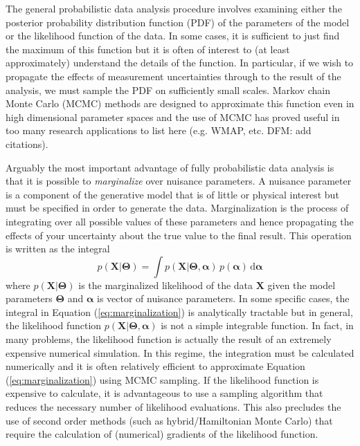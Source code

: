 \documentclass[12pt,preprint]{aastex}
\newcommand{\eq}[1]{Equation (\ref{eq:#1})}
\newcommand{\eqlabel}[1]{\label{eq:#1}}
\newcommand{\dd}{\mathrm{d}}
\begin{document}
The general probabilistic data analysis procedure involves examining either
the posterior probability distribution function (PDF) of the parameters
of the model or the likelihood function of the data. In some cases, it is
sufficient to just find the maximum of this function but it is often of
interest to (at least approximately) understand the details of the function.
In particular, if we wish to propagate the effects of measurement
uncertainties through to the result of the analysis, we must sample the
PDF on sufficiently small scales. Markov chain Monte Carlo (MCMC)
methods are designed to approximate this function even in high dimensional
parameter spaces and the use of MCMC has proved useful in too many research
applications to list here (e.g. WMAP, etc. DFM: add citations).

Arguably the most important advantage of fully probabilistic data analysis is
that it is possible to \emph{marginalize} over nuisance parameters. A
nuisance parameter is a component of the generative model that is of little
or physical interest but must be specified in order to generate the data.
Marginalization is the process of integrating over all possible values of
these parameters and hence propagating the effects of your uncertainty about
the true value to the final result. This operation is written as the integral
\begin{equation}
    \eqlabel{marginalization}
    p (\mathbf{X} | \boldsymbol{\Theta}) = \int
        p (\mathbf{X} | \boldsymbol{\Theta},\boldsymbol{\alpha}) \,
        p (\boldsymbol{\alpha}) \, \dd \boldsymbol{\alpha}
\end{equation}
where $p (\mathbf{X} | \boldsymbol{\Theta})$ is the marginalized likelihood
of the data $\mathbf{X}$ given the model parameters $\boldsymbol{\Theta}$
and $\boldsymbol{\alpha}$ is vector of nuisance parameters. In some specific
cases, the integral in \eq{marginalization} is analytically tractable but in
general, the likelihood function
$p (\mathbf{X} | \boldsymbol{\Theta},\boldsymbol{\alpha})$ is not a simple
integrable function. In fact, in many problems, the likelihood
function is actually the result of an extremely expensive numerical
simulation. In this regime, the integration must be calculated numerically
and it is often relatively efficient to approximate \eq{marginalization}
using MCMC sampling. If the likelihood function is expensive to
calculate, it is advantageous to use a sampling algorithm that reduces the
necessary number of likelihood evaluations. This also precludes the use of
second order methods (such as hybrid/Hamiltonian Monte Carlo) that require
the calculation of (numerical) gradients of the likelihood function.
\end{document}
